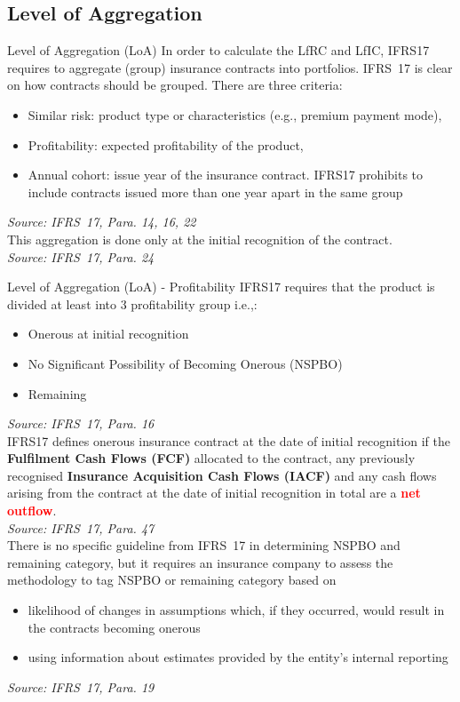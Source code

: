 \documentclass[aspectratio=169]{beamer}
\begin{document}
\subsection{Level of Aggregation}
\begin{frame}{Level of Aggregation (LoA)}
In order to calculate the LfRC and LfIC, IFRS17 requires to aggregate (group) insurance contracts into portfolios. IFRS~17 is clear on how contracts should be grouped. There are three criteria:
\begin{itemize}
  \item Similar risk: product type or characteristics (e.g., premium payment mode),
  \item Profitability: expected profitability of the product,
  \item Annual cohort: issue year of the insurance contract. IFRS17 prohibits to include contracts issued more than one year apart in the same group 
\end{itemize} 
\footnotesize
\textit{Source: IFRS~17, Para. 14, 16, 22}\\
\normalsize
This aggregation is done only at the initial recognition of the contract. \\
\footnotesize
\textit{Source: IFRS~17, Para. 24}
\end{frame}

\begin{frame}[allowframebreaks]{Level of Aggregation (LoA) - Profitability}
IFRS17 requires that the product is divided at least into 3 profitability group i.e.,:
\begin{itemize}
  \item Onerous at initial recognition
  \item No Significant Possibility of Becoming Onerous (NSPBO) 
  \item Remaining
\end{itemize}
\footnotesize
\textit{Source: IFRS~17, Para. 16} \\
\normalsize
IFRS17 defines onerous insurance contract at the date of initial recognition if the \textbf{Fulfilment Cash Flows (FCF)} allocated to the contract, any previously recognised \textbf{Insurance Acquisition Cash Flows (IACF)} and any cash flows arising from the contract at the date of initial recognition in total are a \textbf{\textcolor{red}{net outflow}}. \\ 
\footnotesize
\textit{Source: IFRS~17, Para. 47} \\
\framebreak
\normalsize
There is no specific guideline from IFRS~17 in determining NSPBO and remaining category, but it requires an insurance company to assess the methodology to tag NSPBO or remaining category based on \begin{itemize}
  \item likelihood of changes in assumptions which, if they
occurred, would result in the contracts becoming onerous 
\item using information about estimates provided by the entity’s internal
reporting 
\end{itemize}
\footnotesize
\textit{Source: IFRS~17, Para. 19} \\
\normalsize
\end{frame}
\end{document}
